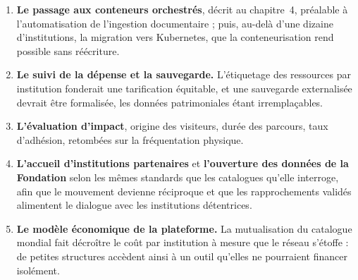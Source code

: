 \begin{enumerate}
  \item \textbf{Le passage aux conteneurs orchestrés}, décrit au chapitre~4,
        préalable à l'automatisation de l'ingestion documentaire ; puis, au-delà
        d'une dizaine d'institutions, la migration vers Kubernetes, que la
        conteneurisation rend possible sans réécriture.

  \item \textbf{Le suivi de la dépense et la sauvegarde.} L'étiquetage des
        ressources par institution fonderait une tarification équitable, et une
        sauvegarde externalisée devrait être formalisée, les données
        patrimoniales étant irremplaçables.

  \item \textbf{L'évaluation d'impact}, origine des visiteurs, durée des
        parcours, taux d'adhésion, retombées sur la fréquentation physique.

  \item \textbf{L'accueil d'institutions partenaires} et \textbf{l'ouverture des
        données de la Fondation} selon les mêmes standards que les catalogues
        qu'elle interroge, afin que le mouvement devienne réciproque et que les
        rapprochements validés alimentent le dialogue avec les institutions
        détentrices.

  \item \textbf{Le modèle économique de la plateforme.} La mutualisation du
        catalogue mondial fait décroître le coût par institution à mesure que le
        réseau s'étoffe : de petites structures accèdent ainsi à un outil
        qu'elles ne pourraient financer isolément.
\end{enumerate}
